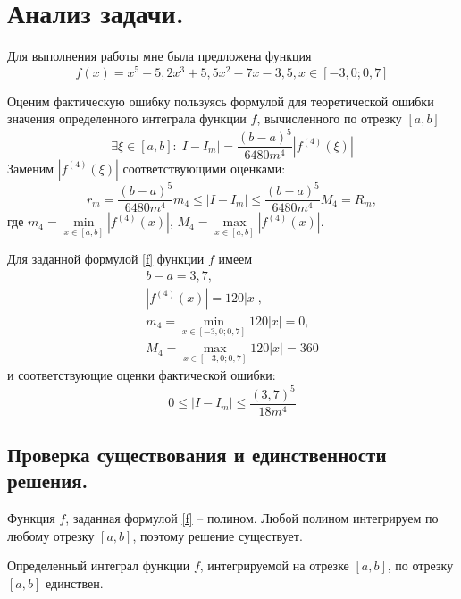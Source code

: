 \documentclass[a4paper, 12pt]{article}
\begin{document}
	\section{Анализ задачи.}
	
	Для выполнения работы мне была предложена функция
	\begin{equation} \label{f}
		f(x)=x^5-5,2x^3+5,5x^2-7x-3,5, x\in[-3,0;0,7]
	\end{equation}
	
	Оценим фактическую ошибку пользуясь формулой для теоретической ошибки значения определенного интеграла функции $f$, вычисленного по отрезку $[a,b]$
	\begin{equation}
		\exists\xi\in[a,b]:|I-I_m|=\frac{(b-a)^5}{6480m^4}|f^{(4)}(\xi)|
	\end{equation}
	Заменим $|f^{(4)}(\xi)|$ соответствующими оценками:
	\begin{equation} \label{theor_est}
		r_m=\frac{(b-a)^5}{6480m^4}m_4 \leq |I-I_m| \leq \frac{(b-a)^5}{6480m^4}M_4=R_m,
	\end{equation}
	где $m_4=\min\limits_{x\in[a,b]}|f^{(4)}(x)|$, $M_4=\max\limits_{x\in[a,b]}|f^{(4)}(x)|$.
	
	Для заданной формулой \eqref{f} функции $f$ имеем
	\begin{equation*} 
		\begin{gathered}
			b-a=3,7,\\
			|f^{(4)}(x)|=120|x|,\\
			m_4=\min\limits_{x\in[-3,0;0,7]}120|x|=0,\\
			M_4=\max\limits_{x\in[-3,0;0,7]}120|x|=360
		\end{gathered}
	\end{equation*}
	и соответствующие оценки фактической ошибки:
	\begin{equation} \label{final_est}
		0 \leq |I-I_m| \leq \frac{(3,7)^5}{18m^4}
	\end{equation}
	
	\subsection{Проверка существования и единственности решения.}
	\label{solexistance}
	
	Функция $f$, заданная формулой \eqref{f} -- полином. Любой полином интегрируем по любому отрезку $[a,b]$, поэтому решение существует.
	
	Определенный интеграл функции $f$, интегрируемой на отрезке $[a,b]$, по отрезку $[a,b]$ единствен.
	
\end{document}

